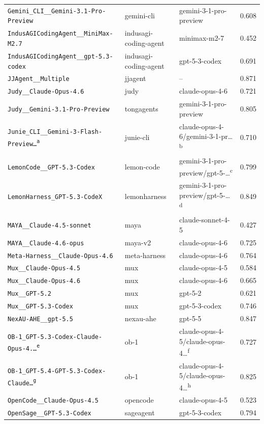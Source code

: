 \documentclass{article}
\begin{document}
\begin{center}
\begin{longtable}{lllc}
\texttt{Gemini\_CLI\_\_Gemini-3.1-Pro-Preview} & gemini-cli & gemini-3-1-pro-preview & 0.608 \\
\texttt{IndusAGICodingAgent\_\_MiniMax-M2.7} & indusagi-coding-agent & minimax-m2-7 & 0.452 \\
\texttt{IndusAGICodingAgent\_\_gpt-5.3-codex} & indusagi-coding-agent & gpt-5-3-codex & 0.691 \\
\texttt{JJAgent\_\_Multiple} & jjagent & -- & 0.871 \\
\texttt{Judy\_\_Claude-Opus-4.6} & judy & claude-opus-4-6 & 0.721 \\
\texttt{Judy\_\_Gemini-3.1-Pro-Preview} & tongagents & gemini-3-1-pro-preview & 0.805 \\
\texttt{Junie\_CLI\_\_Gemini-3-Flash-Preview\ldots\textsuperscript{a}} & junie-cli & claude-opus-4-6/gemini-3-1-pr\ldots\textsuperscript{b} & 0.710 \\
\texttt{LemonCode\_\_GPT-5.3-Codex} & lemon-code & gemini-3-1-pro-preview/gpt-5-\ldots\textsuperscript{c} & 0.799 \\
\texttt{LemonHarness\_GPT-5.3-CodeX} & lemonharness & gemini-3-1-pro-preview/gpt-5-\ldots\textsuperscript{d} & 0.849 \\
\texttt{MAYA\_\_Claude-4.5-sonnet} & maya & claude-sonnet-4-5 & 0.427 \\
\texttt{MAYA\_\_Claude-4.6-opus} & maya-v2 & claude-opus-4-6 & 0.725 \\
\texttt{Meta-Harness\_\_Claude-Opus-4.6} & meta-harness & claude-opus-4-6 & 0.764 \\
\texttt{Mux\_\_Claude-Opus-4.5} & mux & claude-opus-4-5 & 0.584 \\
\texttt{Mux\_\_Claude-Opus-4.6} & mux & claude-opus-4-6 & 0.665 \\
\texttt{Mux\_\_GPT-5.2} & mux & gpt-5-2 & 0.621 \\
\texttt{Mux\_\_GPT-5.3-Codex} & mux & gpt-5-3-codex & 0.746 \\
\texttt{NexAU-AHE\_\_gpt-5.5} & nexau-ahe & gpt-5-5 & 0.847 \\
\texttt{OB-1\_GPT-5.3-Codex-Claude-Opus-4.\ldots\textsuperscript{e}} & ob-1 & claude-opus-4-5/claude-opus-4\ldots\textsuperscript{f} & 0.727 \\
\texttt{OB-1\_GPT-5.4-GPT-5.3-Codex-Claude\ldots\textsuperscript{g}} & ob-1 & claude-opus-4-5/claude-opus-4\ldots\textsuperscript{h} & 0.825 \\
\texttt{OpenCode\_\_Claude-Opus-4.5} & opencode & claude-opus-4-5 & 0.523 \\
\texttt{OpenSage\_\_GPT-5.3-Codex} & sageagent & gpt-5-3-codex & 0.794 \\

\end{longtable}
\end{center}
\end{document}
